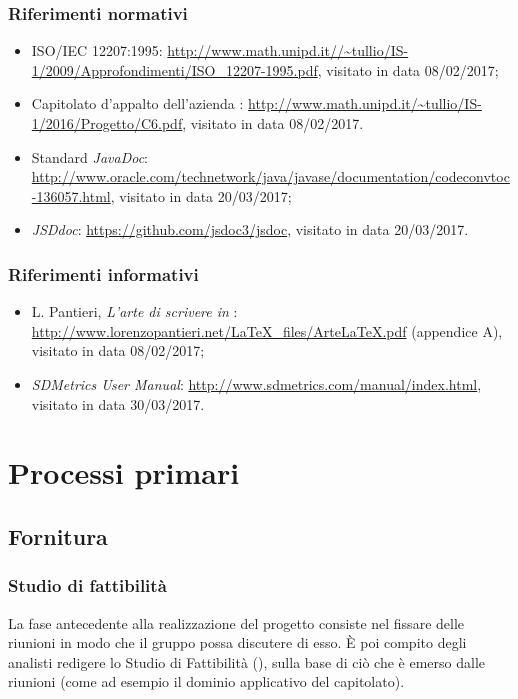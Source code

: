 \subsubsection{Riferimenti normativi}
\begin{itemize}
	\item ISO/IEC 12207:1995: \url{http://www.math.unipd.it//~tullio/IS-1/2009/Approfondimenti/ISO_12207-1995.pdf}, visitato in data 08/02/2017;
	\item Capitolato d'appalto dell'azienda \ZU: \url{http://www.math.unipd.it/~tullio/IS-1/2016/Progetto/C6.pdf}, visitato in data 08/02/2017.
	\item Standard \emph{JavaDoc}: \url{http://www.oracle.com/technetwork/java/javase/documentation/codeconvtoc-136057.html}, visitato in data 20/03/2017;
	\item {} \emph{JSDdoc}: \url{https://github.com/jsdoc3/jsdoc}, visitato in data 20/03/2017.
\end{itemize}

\subsubsection{Riferimenti informativi}
\begin{itemize}
	\item L. Pantieri, \emph{L'arte di scrivere in }: \url{http://www.lorenzopantieri.net/LaTeX_files/ArteLaTeX.pdf} (appendice A), visitato in data 08/02/2017;
	\item \emph{SDMetrics User Manual}: \url{http://www.sdmetrics.com/manual/index.html}, visitato in data 30/03/2017.
\end{itemize}






\section{Processi primari} \label{sec:primari}


\subsection{Fornitura}

\subsubsection{Studio di fattibilità}
La fase antecedente alla realizzazione del progetto consiste nel fissare delle riunioni in modo che il gruppo possa discutere di esso. È poi compito degli analisti redigere lo Studio di Fattibilità (\SdF), sulla base di ciò che è emerso dalle riunioni (come ad esempio il dominio applicativo del capitolato).

